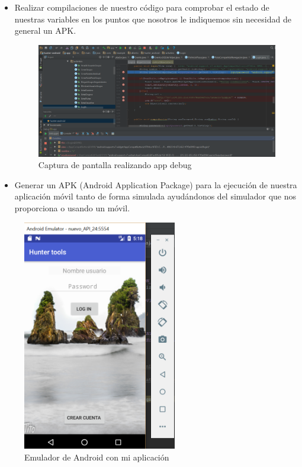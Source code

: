 \begin{itemize}
\item Realizar compilaciones  de nuestro código para comprobar el estado de nuestras variables en los puntos que nosotros le indiquemos sin necesidad de general un APK.
\begin{figure}
		\centering
		\includegraphics[width=\textwidth] {debug.png}
		\caption{Captura de pantalla realizando app debug }\label{fig:debug}
	\end{figure}

\item Generar un APK (Android Application Package) para la ejecución de nuestra aplicación móvil tanto de forma simulada ayudándonos del simulador que nos proporciona o usando un móvil.
\end{itemize}
\begin{figure}[H]
		\centering
		\includegraphics[width=0.6\textwidth] {emulador.png}
		\caption{Emulador de Android con mi aplicación}
		\label{fig:emulador}
	\end{figure}
 

